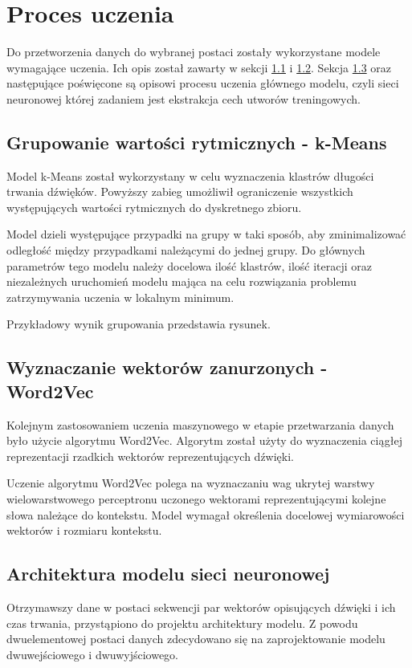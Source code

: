 \chapter{Proces uczenia} 
{
    Do przetworzenia danych do wybranej postaci zostały wykorzystane modele wymagające uczenia.
    Ich opis został zawarty w sekcji \ref{chap:models_data_k} i\,\,\ref{chap:models_data_v}. Sekcja \ref{chap:main_model} oraz następujące
    poświęcone są opisowi procesu uczenia głównego modelu, czyli sieci neuronowej której 
    zadaniem jest ekstrakcja cech utworów treningowych.

    \section{Grupowanie wartości rytmicznych - k-Means}\label{chap:models_data_k}
    {
        Model k-Means został wykorzystany w\,\,celu wyznaczenia klastrów
        długości trwania dźwięków. Powyższy zabieg umożliwił ograniczenie wszystkich występujących 
        wartości rytmicznych do dyskretnego zbioru. 
        
        Model dzieli występujące przypadki na grupy w taki sposób, aby zminimalizować odległość 
        między przypadkami należącymi do jednej grupy.
        Do głównych parametrów tego modelu należy docelowa ilość klastrów, ilość iteracji
        oraz niezależnych uruchomień modelu mająca na celu rozwiązania problemu zatrzymywania uczenia w\,\,lokalnym minimum.

        Przykładowy wynik grupowania przedstawia rysunek.
    }

    \section{Wyznaczanie wektorów zanurzonych - Word2Vec}\label{chap:models_data_v}
    {
        Kolejnym zastosowaniem uczenia maszynowego w\,\,etapie przetwarzania danych było użycie algorytmu Word2Vec. Algorytm 
        został użyty do wyznaczenia ciągłej reprezentacji rzadkich wektorów reprezentujących dźwięki.
        
        Uczenie algorytmu Word2Vec polega na wyznaczaniu wag ukrytej warstwy wielowarstwowego perceptronu
        uczonego wektorami reprezentującymi kolejne słowa należące do kontekstu.
        Model wymagał określenia docelowej wymiarowości wektorów i\,\,rozmiaru kontekstu. 
    }
    
    \section{Architektura modelu sieci neuronowej}\label{chap:main_model}
    {
        Otrzymawszy dane w\,\,postaci sekwencji par wektorów opisujących dźwięki i\,\,ich czas trwania,
        przystąpiono do projektu architektury modelu. Z\,\,powodu dwuelementowej postaci danych
        zdecydowano się na zaprojektowanie modelu dwuwejściowego i\,\,dwuwyjściowego.

}}
